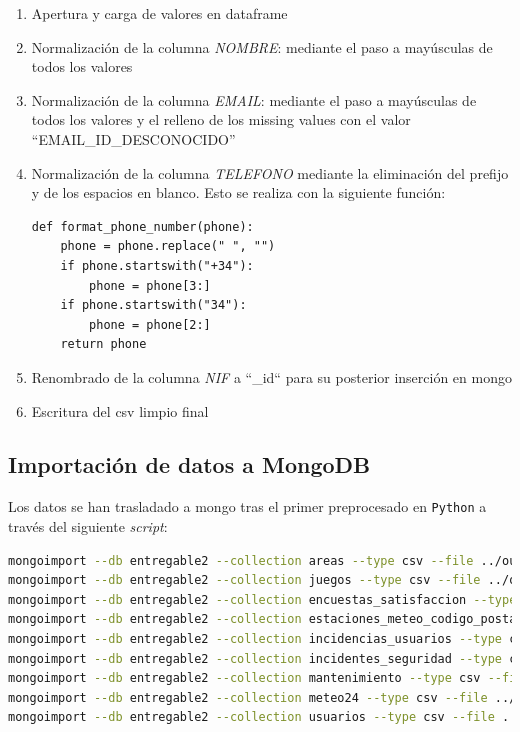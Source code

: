 \documentclass[]{article}
\begin{document}
\begin{enumerate}
    \item Apertura y carga de valores en dataframe
    \item Normalización de la columna \textit{NOMBRE}: mediante el paso a mayúsculas de todos los valores
    \item Normalización de la columna \textit{EMAIL}: mediante el paso a mayúsculas de todos los valores y el relleno de los missing values con el valor ``EMAIL\_ID\_DESCONOCIDO''
    \item Normalización de la columna \textit{TELEFONO} mediante la eliminación del prefijo y de los espacios en blanco. Esto se realiza con la siguiente función:

\begin{lstlisting}
def format_phone_number(phone):
    phone = phone.replace(" ", "")
    if phone.startswith("+34"):
        phone = phone[3:]
    if phone.startswith("34"):
        phone = phone[2:]
    return phone
\end{lstlisting}

    \item Renombrado de la columna \textit{NIF} a ``\_id`` para su posterior inserción en mongo
    \item Escritura del csv limpio final
\end{enumerate}

\subsection{Importación de datos a MongoDB}
\label{subsec:importacion}
Los datos se han trasladado a mongo tras el primer preprocesado en \texttt{Python} a través del siguiente \textit{script}:

\begin{lstlisting}[caption=Script para la importación en Mongo, language=bash]
mongoimport --db entregable2 --collection areas --type csv --file ../output/areas_limpias.csv --headerline
mongoimport --db entregable2 --collection juegos --type csv --file ../output/juegos_limpio.csv --headerline
mongoimport --db entregable2 --collection encuestas_satisfaccion --type csv --file ../output/encuestas_satisfaccion_limpio.csv --headerline
mongoimport --db entregable2 --collection estaciones_meteo_codigo_postal --type csv --file ../output/estaciones_meteo_codigo_postal.csv --headerline 
mongoimport --db entregable2 --collection incidencias_usuarios --type csv --file ../output/incidencias_usuarios_limpio.csv --headerline
mongoimport --db entregable2 --collection incidentes_seguridad --type csv --file ../output/incidentes_seguridad_limpio.csv --headerline
mongoimport --db entregable2 --collection mantenimiento --type csv --file ../output/mantenimiento_limpio.csv --headerline
mongoimport --db entregable2 --collection meteo24 --type csv --file ../output/meteo24_limpio.csv --headerline 
mongoimport --db entregable2 --collection usuarios --type csv --file ../output/usuarios_limpios.csv --headerline
\end{lstlisting}
\end{document}
